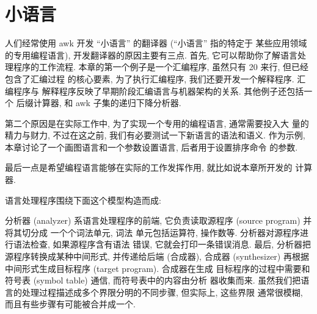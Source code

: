 \chapter{小语言}
\label{chap:little_languages}

人们经常使用 awk 开发 ``小语言'' 的翻译器 (``小语言'' 指的特定于
某些应用领域的专用编程语言), 
开发翻译器的原因主要有三点. 首先, 它可以帮助你了解语言处理程序的工作流程.
本章的第一个例子是一个汇编程序, 虽然只有 20 来行, 但已经包含了汇编过程
的核心要素, 为了执行汇编程序, 我们还要开发一个解释程序. 汇编程序与
解释程序反映了早期阶段汇编语言与机器架构的关系. 其他例子还包括一个
后缀计算器, 和 awk 子集的递归下降分析器.

第二个原因是在实际工作中, 为了实现一个专用的编程语言, 通常需要投入大
量的精力与财力, 不过在这之前, 我们有必要测试一下新语言的语法和语义. 
作为示例, 本章讨论了一个画图语言和一个参数设置语言, 后者用于设置排序命令
的参数.

最后一点是希望编程语言能够在实际的工作发挥作用, 就比如说本章所开发的
计算器.

语言处理程序围绕下面这个模型构造而成:
\begin{center}
\end{center}

分析器 (analyzer) 系语言处理程序的前端, 它负责读取源程序 (source program)
并将其切分成 一个个词法单元, 词法
单元包括运算符, 操作数等. 分析器对源程序进行语法检查, 如果源程序含有语法
错误, 它就会打印一条错误消息. 最后, 分析器把源程序转换成某种中间形式,
并传递给后端 (合成器), 合成器 (synthesizer) 再根据中间形式生成目标程序
(target program). 合成器在生成
目标程序的过程中需要和符号表 (symbol table) 通信, 而符号表中的内容由分析
器收集而来.
虽然我们把语言的处理过程描述成多个界限分明的不同步骤, 但实际上, 这些界限
通常很模糊, 而且有些步骤有可能被合并成一个.

